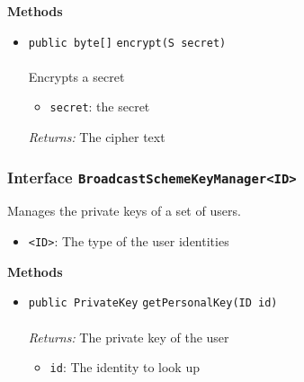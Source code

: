 \textbf{\sffamily Methods}
\begin{itemize}
\item \lstinline|public byte[]| \lstinline|encrypt|\lstinline|(S secret)|\\ \\[-0.6em]
Encrypts a secret
\begin{itemize}
\item \lstinline|secret|: the secret
\end{itemize}

\emph{Returns:} The cipher text

\end{itemize}

\subsubsection{Interface \lstinline|BroadcastSchemeKeyManager<ID>|}
Manages the private keys of a set of users. \\
\noindent\begin{minipage}[t]{5cm}
\vspace{0.3em}
\hspace*{2em}
\vspace{0.3em}
\end{minipage}

\begin{itemize}
\item \lstinline|<ID>|: The type of the user identities
\end{itemize}




\textbf{\sffamily Methods}
\begin{itemize}
\item \lstinline|public PrivateKey| \lstinline|getPersonalKey|\lstinline|(ID id)|\\ \\[-0.6em]
\emph{Returns:} The private key of the user
\begin{itemize}
\item \lstinline|id|: The identity to look up
\end{itemize}



\end{itemize}

